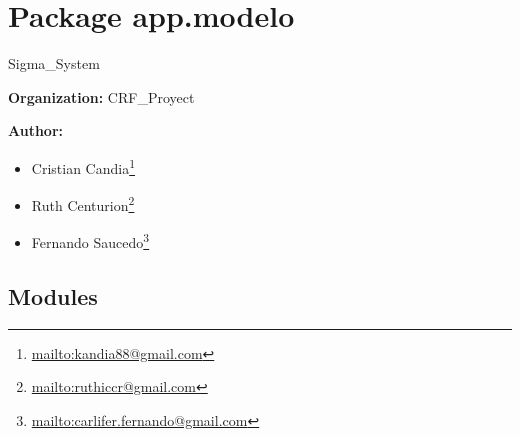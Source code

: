 %
%
%


\section{Package app.modelo}

    \label{app:modelo}
Sigma\_System

\textbf{Organization:} CRF\_Proyect



\textbf{Author:} \begin{itemize}
\setlength{\parskip}{0.6ex}
  \item Cristian 
    Candia\footnote{\href{mailto:kandia88@gmail.com}{mailto:kandia88@gmail.com}}

  \item Ruth 
    Centurion\footnote{\href{mailto:ruthiccr@gmail.com}{mailto:ruthiccr@gmail.com}}

  \item Fernando 
    Saucedo\footnote{\href{mailto:carlifer.fernando@gmail.com}{mailto:carlifer.fernando@gmail.com}}

\end{itemize}





\subsection{Modules}


